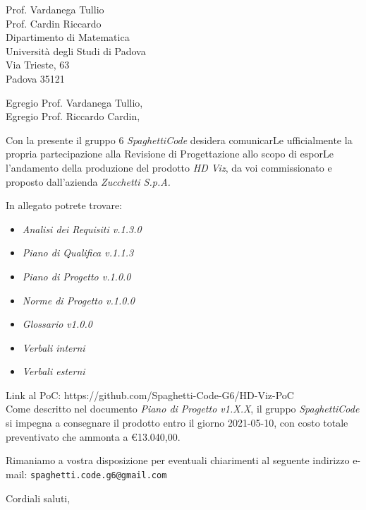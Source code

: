 \documentclass[a4paper,12pt]{letteracdp}
\date{10 marzo 2021}
\begin{document}
\begin{letter}{
		\vspace*{-2\baselineskip}
		Prof. Vardanega Tullio \\
		Prof. Cardin Riccardo \\
		Dipartimento di Matematica \\
		Università degli Studi di Padova \\
		Via Trieste, 63 \\
		Padova 35121}

	\opening{Egregio Prof. Vardanega Tullio, \\
	\noindent Egregio Prof. Riccardo Cardin,}

	\begin{flushleft}
		Con la presente il gruppo 6 \textit{SpaghettiCode} desidera comunicarLe ufficialmente la propria partecipazione alla Revisione di Progettazione allo scopo di esporLe l'andamento della produzione del prodotto 
        \textit{HD Viz}, da voi commissionato e proposto dall'azienda \textit{Zucchetti S.p.A.}
        
		In allegato potrete trovare:
	\end{flushleft}

	\begin{itemize}
		\item \emph{Analisi dei Requisiti v.1.3.0}
		\item \emph{Piano di Qualifica v.1.1.3}
		\item \emph{Piano di Progetto v.1.0.0}
		\item \emph{Norme di Progetto v.1.0.0}
		\item \emph{Glossario v1.0.0}
		\item \emph{Verbali interni}
		\item \emph{Verbali esterni}
	\end{itemize}
	
	\begin{flushleft}
		Link al PoC: https://github.com/Spaghetti-Code-G6/HD-Viz-PoC \\
		Come descritto nel documento \emph{Piano di Progetto v1.X.X}, il gruppo \textit{SpaghettiCode} si impegna a consegnare il prodotto entro il giorno 2021-05-10, con costo totale preventivato che ammonta a \euro{13.040,00}.

		Rimaniamo a vostra disposizione per eventuali chiarimenti al seguente indirizzo e-mail: {\texttt{spaghetti.code.g6@gmail.com}}
	\end{flushleft}

	\closing{Cordiali saluti,}

\end{letter}
\end{document}
